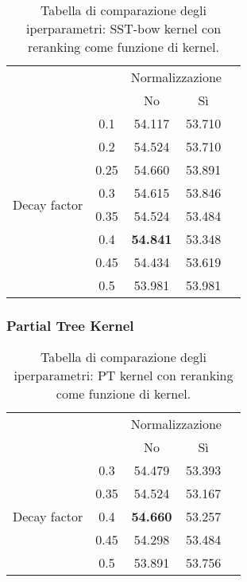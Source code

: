 \begin{table}[H]
    \centering
    \begin{tabular}{cc|ccc}
        \toprule
        &           & \multicolumn{2}{c}{Normalizzazione}           \\
        &           & No                    & Sì                    \\
        \hline
        \multirow{8}{*}{\begin{sideways}Decay factor\end{sideways}}
        & 0.1       & 54.117                & 53.710                \\
        & 0.2       & 54.524                & 53.710                \\
        & 0.25      & 54.660                & 53.891                \\
        & 0.3       & 54.615                & 53.846                \\
        & 0.35      & 54.524                & 53.484                \\
        & 0.4       & \textbf{54.841}       & 53.348                \\
        & 0.45      & 54.434                & 53.619                \\
        & 0.5       & 53.981                & 53.981                \\
        \bottomrule
    \end{tabular}
    \caption{Tabella di comparazione degli iperparametri: SST-bow kernel con
    reranking come funzione di kernel.}
\end{table}

\subsubsection{Partial Tree Kernel}

\begin{table}[H]
    \centering
    \begin{tabular}{cc|ccc}
        \toprule
        &           & \multicolumn{2}{c}{Normalizzazione}           \\
        &           & No                    & Sì                    \\
        \hline
        \multirow{5}{*}{\begin{sideways}Decay factor\end{sideways}}
        & 0.3       & 54.479                & 53.393                \\
        & 0.35      & 54.524                & 53.167                \\
        & 0.4       & \textbf{54.660}       & 53.257                \\
        & 0.45      & 54.298                & 53.484                \\
        & 0.5       & 53.891                & 53.756                \\
        \bottomrule
    \end{tabular}
    \caption{Tabella di comparazione degli iperparametri: PT kernel con
    reranking come funzione di kernel.}
\end{table}

